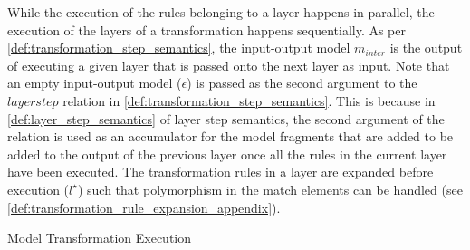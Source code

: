 While the execution of the rules belonging to a layer happens in parallel, the execution of the layers of a transformation happens sequentially. As per \cref{def:transformation_step_semantics}, the input-output model $m_{inter}$ is the output of executing a given layer that is passed onto the next layer as input. Note that an empty input-output model ($\epsilon$) is passed as the second argument to the $layerstep$ relation in \cref{def:transformation_step_semantics}. This is because in \cref{def:layer_step_semantics} of layer step semantics, the second argument of the relation is used as an accumulator for the model fragments that are added to be added to the output of the previous layer once all the rules in the current layer have been executed. The transformation rules in a layer are expanded before execution ($l^{\star}$) such that polymorphism in the match elements can be handled (see \cref{def:transformation_rule_expansion_appendix}). 

\begin{definition} {Model Transformation Execution}
\label{def:modeltransformation_appendix} 

\end{definition}



% 

